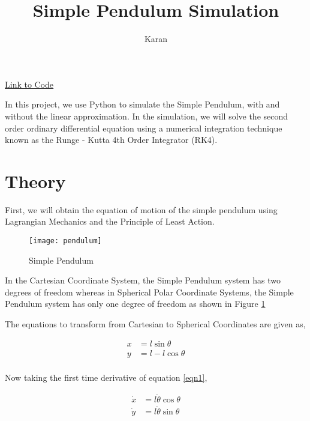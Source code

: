 \documentclass[12pt]{article}
\title{Simple Pendulum Simulation}
\author{Karan}
\begin{document}
\maketitle

\begin{center}
    \textcolor{blue}{\underline{\href{https://github.com/kkin1995/simulations/}{Link to Code}}}
\end{center}



In this project, we use Python to simulate the Simple Pendulum, with and without the linear approximation.
In the simulation, we will solve the second order ordinary differential equation using a numerical integration
technique known as the Runge - Kutta 4th Order Integrator (RK4). \newline

\section{Theory}

First, we will obtain the equation of motion of the simple pendulum using Lagrangian Mechanics and the Principle of Least
Action. \newline

\begin{figure}
    \caption{Simple Pendulum}
    \texttt{[image: pendulum]}
    \label{fig:sp}
\end{figure}

In the Cartesian Coordinate System, the Simple Pendulum system has two degrees of freedom whereas
in Spherical Polar Coordinate Systems, the Simple Pendulum system has only one degree of freedom as shown in Figure \ref{fig:sp} \newline

The equations to transform from Cartesian to Spherical Coordinates are given as,

\begin{equation} \label{eqn1}
    \begin{split}
        x &= l\sin{\theta} \\ 
        y &= l - l\cos{\theta} \\
    \end{split}
\end{equation}

Now taking the first time derivative of equation \ref{eqn1},

\begin{equation} \label{eqn2}
    \begin{split}
        \dot{x} &= l \dot{\theta} \cos{\theta}  \\
        \dot{y} &= l \dot{\theta} \sin{\theta}  \\
    \end{split}
\end{equation}
\end{document}
